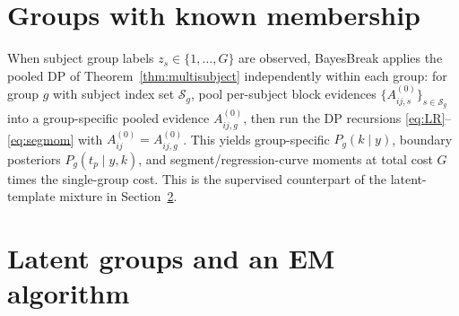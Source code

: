 \section{Groups with known membership}
\label{sec:groups-known}

When subject group labels $z_s\in\{1,\dots,G\}$ are observed, BayesBreak applies the pooled DP
of Theorem~\ref{thm:multisubject} independently within each group: for group $g$ with subject
index set $\mathcal{S}_g$, pool per-subject block evidences
$\{A^{(0)}_{ij,s}\}_{s\in\mathcal{S}_g}$ into a group-specific pooled evidence
$A^{(0)}_{ij,g}$, then run the DP recursions \eqref{eq:LR}--\eqref{eq:segmom} with
$A^{(0)}_{ij}=A^{(0)}_{ij,g}$. This yields group-specific $P_g(k\mid y)$, boundary posteriors
$P_g(t_p\mid y,k)$, and segment/regression-curve moments at total cost $G$ times the
single-group cost. This is the supervised counterpart of the latent-template mixture in
Section~\ref{sec:latent-em}.

\section{Latent groups and an EM algorithm}
\label{sec:latent-em}

